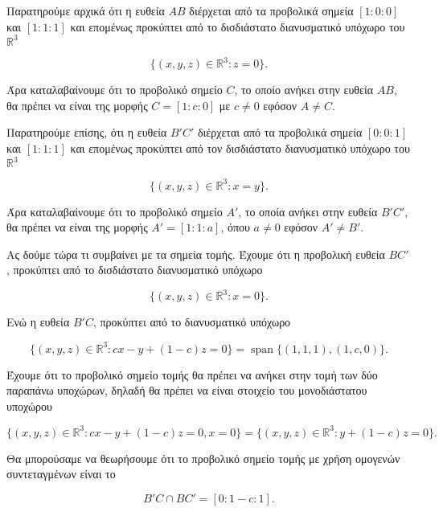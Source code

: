 \documentclass[12pt, a4paper]{book}
\DeclareMathOperator{\Span}{span}
\begin{document}
Παρατηρούμε αρχικά ότι η ευθεία $AB$ διέρχεται από τα προβολικά σημεία $[1:0:0]$ και $[1:1:1]$ και επομένως προκύπτει από το δισδιάστατο διανυσματικό υπόχωρο του $\mathbb{R}^3$

\begin{displaymath}
\{(x,y,z) \in \mathbb{R}^3: z=0\}.
\end{displaymath}

Άρα καταλαβαίνουμε ότι το προβολικό σημείο $C$, το οποίο ανήκει στην ευθεία $AB$, θα πρέπει να είναι της μορφής $C=[1:c:0]$ με $c \neq 0$ εφόσον $A \neq C$.

Παρατηρούμε επίσης, ότι η ευθεία $B'C'$  διέρχεται από τα προβολικά σημεία $[0:0:1]$ και $[1:1:1]$ και επομένως προκύπτει από τον δισδιάστατο διανυσματικό υπόχωρο του $\mathbb{R}^3$

\begin{displaymath}
\{(x,y,z) \in \mathbb{R}^3: x=y\}.
\end{displaymath}

Άρα καταλαβαίνουμε ότι το προβολικό σημείο $A'$, το οποία ανήκει στην ευθεία $B'C'$, θα πρέπει να είναι της μορφής $Α'=[1:1:a]$, όπου $a \neq 0$ εφόσον $A' \neq B'$.

Ας δούμε τώρα τι συμβαίνει με τα σημεία τομής. Έχουμε ότι η προβολική ευθεία $BC'$, προκύπτει από το δισδιάστατο διανυσματικό υπόχωρο 

\begin{displaymath}
\{(x,y,z)\in \mathbb{R}^3: x =0\}.
\end{displaymath}

Ενώ η ευθεία $B'C$, προκύπτει από το διανυσματικό υπόχωρο

\begin{displaymath}
\{(x,y,z) \in \mathbb{R}^3: cx-y+(1-c)z=0\} = \Span\{(1,1,1),(1,c,0)\}.
\end{displaymath}

Έχουμε ότι το προβολικό σημείο τομής θα πρέπει να ανήκει στην τομή των δύο παραπάνω υποχώρων, δηλαδή θα πρέπει να είναι στοιχείο του μονοδιάστατου υποχώρου

\begin{displaymath}
\{(x,y,z) \in \mathbb{R}^3: cx-y+(1-c)z=0, x=0\} = \{(x,y,z) \in \mathbb{R}^3: y+(1-c)z=0 \}.
\end{displaymath}

Θα μπορούσαμε να θεωρήσουμε ότι το προβολικό σημείο τομής με χρήση ομογενών συντεταγμένων είναι το 

\begin{displaymath}
B'C \cap BC' = [0:1-c:1].
\end{displaymath}
\end{document}
